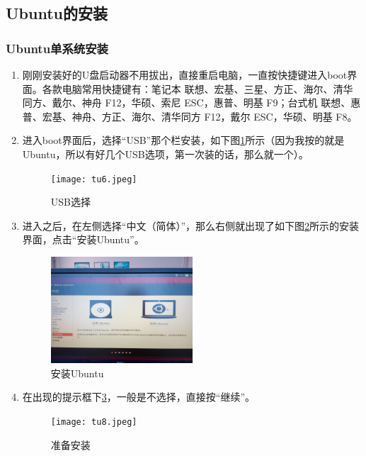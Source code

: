 \documentclass{article}
\begin{document}
\subsection{Ubuntu的安装}

\subsubsection{Ubuntu单系统安装}
\begin{enumerate}

\item  刚刚安装好的U盘启动器不用拔出，直接重启电脑，一直按快捷键进入boot界面。各款电脑常用快捷键有：笔记本 联想、宏基、三星、方正、海尔、清华同方、戴尔、神舟 F12，华硕、索尼 ESC，惠普、明基 F9；台式机 联想、惠普、宏基、神舟、方正、海尔、清华同方 F12，戴尔 ESC，华硕、明基 F8。

\item  进入boot界面后，选择“USB”那个栏安装，如下图\ref{tu6}所示（因为我按的就是Ubuntu，所以有好几个USB选项，第一次装的话，那么就一个）。

\begin{figure}[!htb] %
\centering
\texttt{[image: tu6.jpeg]}
\caption{\small USB选择}
\label{tu6}
\end{figure} 

\item  进入之后，在左侧选择“中文（简体）”，那么右侧就出现了如下图\ref{tu7}所示的安装界面，点击“安装Ubuntu”。

\begin{figure}[!htb] %
\centering
\includegraphics[width=0.5\textwidth]{tu7.jpeg}
\caption{\small 安装Ubuntu}
\label{tu7}
\end{figure}
 
\item   在出现的提示框下\ref{tu8}，一般是不选择，直接按“继续”。

\begin{figure}[!htb] %
\centering
\texttt{[image: tu8.jpeg]}
\caption{\small 准备安装}
\label{tu8}
\end{figure} 


\end{enumerate}
\end{document}
